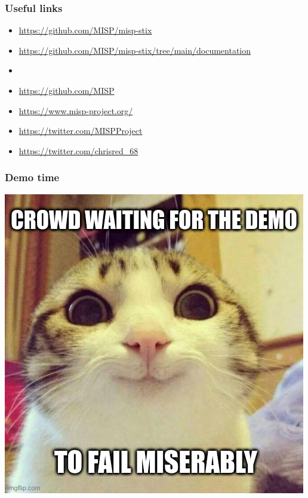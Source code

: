 \begin{frame}
    \frametitle{Useful links}
    \begin{itemize}
        \item \url{https://github.com/MISP/misp-stix}
        \item \url{https://github.com/MISP/misp-stix/tree/main/documentation}
        \item []
        \item \url{https://github.com/MISP}
        \item \url{https://www.misp-project.org/}
        \item \url{https://twitter.com/MISPProject}
        \item \url{https://twitter.com/chrisred_68}
    \end{itemize}
\end{frame}

\begin{frame}
    \frametitle{Demo time}
    \centering
    \includegraphics[scale=0.45]{images/demo2.jpg}
\end{frame}
